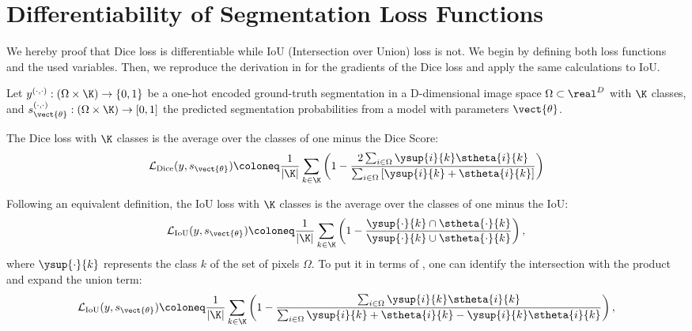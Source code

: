 \section{Differentiability of Segmentation Loss Functions}\label{app:iou}


We hereby proof that Dice loss is differentiable while IoU (Intersection over Union) loss is not. We begin by defining both loss functions and the used variables. Then, we reproduce the derivation in  for the gradients of the Dice loss and apply the same calculations to IoU.

Let $y^{(\cdot,\cdot)}:(\Omega \times \K)\rightarrow\{0, 1\}$ be a one-hot encoded ground-truth segmentation in a D-dimensional image space $\Omega \subset \real^D$ with $\K$ classes, and $s^{(\cdot,\cdot)}_{\vect{\theta}}:(\Omega \times \K)\rightarrow[0, 1]$ the predicted segmentation probabilities from a model with parameters $\vect{\theta}$.

\begin{definition}
The Dice loss with $\K$ classes is the average over the classes of one minus the Dice Score:
\begin{equation}
    \mathcal{L}_\text{Dice}(y, s_{\vect{\theta}}) \coloneq \dfrac{1}{|\K|}\sum_{k\in\K}\left(1 - \dfrac{2\sum_{i\in\Omega} \ysup{i}{k}\stheta{i}{k}}{\sum_{i\in\Omega}\left[\ysup{i}{k} + \stheta{i}{k}\right]}\right)
    \label{eq:app_diceloss}
\end{equation}
\end{definition}

\begin{definition}
    Following an equivalent definition, the IoU loss with $\K$ classes is the average over the classes of one minus the IoU:
    \begin{equation*}
        \mathcal{L}_\text{IoU}(y, s_{\vect{\theta}}) \coloneq \dfrac{1}{|\K|}\sum_{k\in\K}\left(1 - \dfrac{\ysup{\cdot}{k}\cap\stheta{\cdot}{k}}{\ysup{\cdot}{k} \cup \stheta{\cdot}{k}}\right),
    \end{equation*}
    where $\ysup{\cdot}{k}$ represents the class $k$ of the set of pixels $\Omega$. To put it in terms of , one can identify the intersection with the product and expand the union term:
    \begin{equation*}
        \mathcal{L}_\text{IoU}(y, s_{\vect{\theta}}) \coloneq \dfrac{1}{|\K|}\sum_{k\in\K}\left(1 - \dfrac{\sum_{i\in\Omega}\ysup{i}{k}\stheta{i}{k}}{\sum_{i\in\Omega}\ysup{i}{k} + \stheta{i}{k} - \ysup{i}{k}\stheta{i}{k}}\right),
    \end{equation*}
\end{definition}

